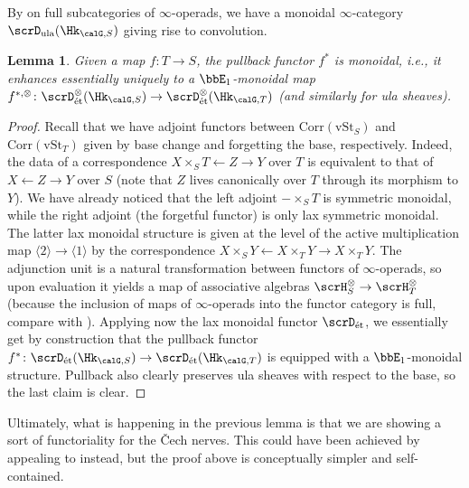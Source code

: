 \documentclass[10pt, reqno]{amsart}
\theoremstyle{plain}
\newtheorem{lemma}[theorem]{Lemma}
\theoremstyle{definition}
\newcommand{\Joao}[1]{\framebox{\begin{varwidth}{0.9\textwidth} João: #1 \end{varwidth}}\newline}
\numberwithin{equation}{section}
\begin{document}
	By \cite[Proposition 2.2.1.1]{Lur17} on full subcategories of $\infty$-operads, we have a monoidal $\infty$-category $\scrD_{\mathrm{ula}}(\Hk_{\calG,S})$ giving rise to convolution.
	
	\begin{lemma}\label{lem_ula_conv}
		Given a map $f\colon T\to S$, the pullback functor $f^*$ is monoidal, i.e., it enhances essentially uniquely to a $\bbE_1$-monoidal map $f^{*,\otimes}\colon \scrD^{\otimes}_{\mathrm{\acute{e}t}}(\Hk_{\calG,S}) \to \scrD^{\otimes}_{\mathrm{\acute{e}t}}(\Hk_{\calG,T})$ (and similarly for ula sheaves).
	\end{lemma}
	\begin{proof}
		Recall that we have adjoint functors between $\mathrm{Corr}(\mathrm{vSt}_S)$ and $\mathrm{Corr}(\mathrm{vSt}_T)$ given by base change and forgetting the base, respectively. Indeed, the data of a correspondence $X\times_S T \leftarrow Z \to Y$ over $T$ is equivalent to that of $X \leftarrow Z \to Y$ over $S$ (note that $Z$ lives canonically over $T$ through its morphism to $Y$). We have already noticed that the left adjoint $-\times_S T$ is symmetric monoidal, while the right adjoint (the forgetful functor) is only lax symmetric monoidal. The latter lax monoidal structure is given at the level of the active multiplication map $\langle 2\rangle\to \langle1\rangle$ by the correspondence $X \times_S Y\leftarrow X\times_T Y \to X \times_T Y$. The adjunction unit is a natural transformation between functors of $\infty$-operads, so upon evaluation it yields a map of associative algebras $\scrH_{S}^{\otimes} \to \scrH_T^{\otimes}$ (because the inclusion of maps of $\infty$-operads into the functor category is full, compare with \cite[Definition 2.1.3.1]{Lur17}). Applying now the lax monoidal functor $\scrD_{\mathrm{\acute{e}t}}$, we essentially get by construction that the pullback functor $f^{\ast}\colon \scrD_{\mathrm{\acute{e}t}}(\Hk_{\calG,S}) \to \scrD_{\mathrm{\acute{e}t}}(\Hk_{\calG,T})$ is equipped with a $\bbE_1$-monoidal structure. Pullback also clearly preserves ula sheaves with respect to the base, so the last claim is clear.
	\end{proof}
	
	Ultimately, what is happening in the previous lemma is that we are showing a sort of functoriality for the \v{C}ech nerves. This could have been achieved by appealing to \cite[Lemma 8.10]{Zhu25} instead, but the proof above is conceptually simpler and self-contained.
	
\end{document}
